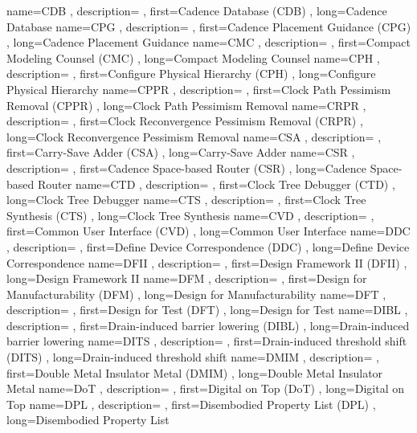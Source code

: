 { name={CDB}
, description={}
, first={Cadence Database (CDB)}
, long={Cadence Database}
}
{ name={CPG}
, description={}
, first={Cadence Placement Guidance (CPG)}
, long={Cadence Placement Guidance}
}
{ name={CMC}
, description={}
, first={Compact Modeling Counsel (CMC)}
, long={Compact Modeling Counsel}
}
{ name={CPH}
, description={}
, first={Configure Physical Hierarchy (CPH)}
, long={Configure Physical Hierarchy}
}
{ name={CPPR}
, description={}
, first={Clock Path Pessimism Removal (CPPR)}
, long={Clock Path Pessimism Removal}
}
{ name={CRPR}
, description={}
, first={Clock Reconvergence Pessimism Removal (CRPR)}
, long={Clock Reconvergence Pessimism Removal}
}
{ name={CSA}
, description={}
, first={Carry-Save Adder (CSA)}
, long={Carry-Save Adder}
}
{ name={CSR}
, description={}
, first={Cadence Space-based Router (CSR)}
, long={Cadence Space-based Router}
}
{ name={CTD}
, description={}
, first={Clock Tree Debugger (CTD)}
, long={Clock Tree Debugger}
}
{ name={CTS}
, description={}
, first={Clock Tree Synthesis (CTS)}
, long={Clock Tree Synthesis}
}
{ name={CVD}
, description={}
, first={Common User Interface (CVD)}
, long={Common User Interface}
}
{ name={DDC}
, description={}
, first={Define Device Correspondence (DDC)}
, long={Define Device Correspondence}
}
{ name={DFII}
, description={}
, first={Design Framework II (DFII)}
, long={Design Framework II}
}
{ name={DFM}
, description={}
, first={Design for Manufacturability (DFM)}
, long={Design for Manufacturability}
}
{ name={DFT}
, description={}
, first={Design for Test (DFT)}
, long={Design for Test}
}
{ name={DIBL}
, description={}
, first={Drain-induced barrier lowering (DIBL)}
, long={Drain-induced barrier lowering}
}
{ name={DITS}
, description={}
, first={Drain-induced threshold shift (DITS)}
, long={Drain-induced threshold shift}
}
{ name={DMIM}
, description={}
, first={Double Metal Insulator Metal (DMIM)}
, long={Double Metal Insulator Metal}
}
{ name={DoT}
, description={}
, first={Digital on Top (DoT)}
, long={Digital on Top}
}
{ name={DPL}
, description={}
, first={Disembodied Property List (DPL)}
, long={Disembodied Property List}
}
